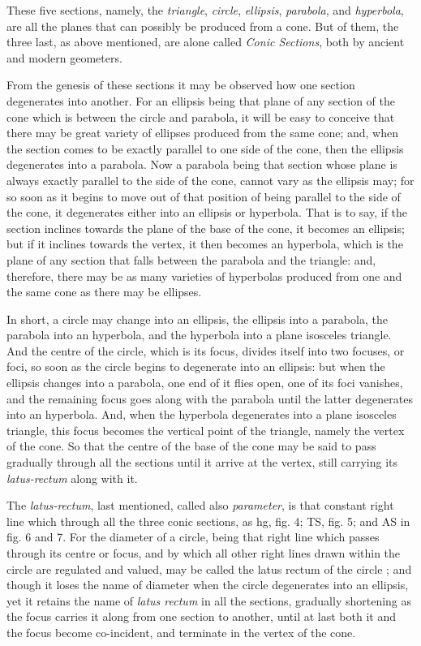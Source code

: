 These five sections, namely, the \textit{triangle}, \textit{circle}, \textit{ellipsis}, \textit{parabola}, and \textit{hyperbola}, are all the planes that can possibly be produced from a cone. But of them, the three last, as above mentioned, are alone called \textit{Conic Sections}, both by ancient and modern geometers. 

From the genesis of these sections it may be observed how one section degenerates into another. For an ellipsis being that plane of any section of the cone which is between the circle and parabola, it will be easy to conceive that there may be great variety of ellipses produced from the same cone; and, when the section comes to be exactly parallel to one side of the cone, then the ellipsis degenerates into a parabola. Now a parabola being that section whose plane is always exactly parallel to the side of the cone, cannot vary as the ellipsis may; for so soon as it begins to move out of that position of being parallel to the side of the cone, it degenerates either into an ellipsis or hyperbola. That is to say, if the section inclines towards the plane of the base of the cone, it becomes an ellipsis; but if it inclines towards the vertex, it then becomes an hyperbola, which is the plane of any section that falls between the parabola and the triangle: and, therefore, there may be as many varieties of hyperbolas produced from one and the same cone as there may be ellipses. 

In short, a circle may change into an ellipsis, the ellipsis into a parabola, the parabola into an hyperbola, and the hyperbola into a plane isosceles triangle. And the centre of the circle, which is its focus, divides itself into two focuses, or foci, so soon as the circle begins to degenerate into an ellipsis: but when the ellipsis changes into a parabola, one end of it flies open, one of its foci vanishes, and the remaining focus goes along with the parabola until the latter degenerates into an hyperbola. And, when the hyperbola degenerates into a plane isosceles triangle, this focus becomes the vertical point of the triangle, namely the vertex of the cone. So that the centre of the base of the cone may be said to pass gradually through all the sections until it arrive at the vertex, still carrying its \textit{latus-rectum} along with it. 

The \textit{latus-rectum}, last mentioned, called also \textit{parameter}, is that constant right line which through all the three conic sections, as hg, fig. 4; TS, fig. 5; and AS in fig. 6 and 7. For the diameter of a circle, being that right line which passes through its centre or focus, and by which all other right lines drawn within the circle are regulated and valued, may be called the latus rectum of the circle ; and though it loses the name of diameter when the circle degenerates into an ellipsis, yet it retains the name of \textit{latus rectum} in all the sections, gradually shortening as the focus carries it along from one section to another, until at last both it and the focus become co-incident, and terminate in the vertex of the cone.

